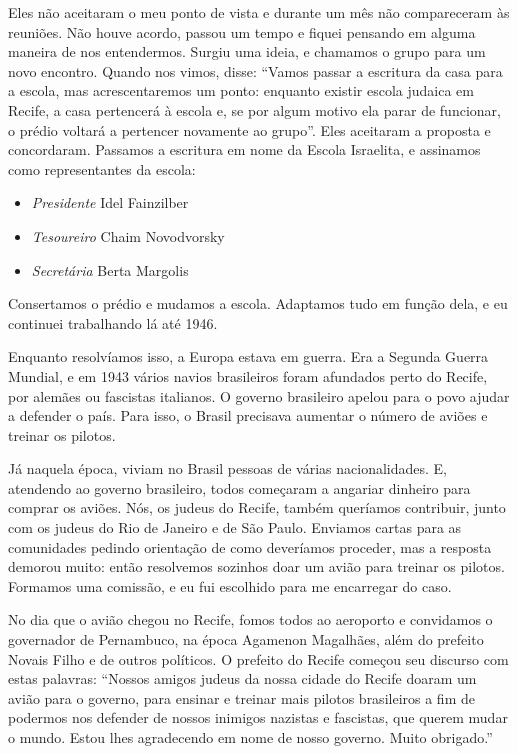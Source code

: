 Eles não aceitaram o meu ponto de vista e durante um mês não
compareceram às reuniões. Não houve acordo, passou
um tempo e fiquei pensando em alguma maneira de nos entendermos.
Surgiu uma ideia, e chamamos o grupo para um novo encontro. Quando nos
vimos, disse: ``Vamos passar a escritura da casa
para a escola, mas acrescentaremos um ponto: enquanto existir escola
judaica em Recife, a casa pertencerá à escola e, se por algum motivo
ela parar de funcionar, o prédio voltará a pertencer novamente ao
grupo''. Eles aceitaram a proposta e concordaram. Passamos a escritura
em nome da Escola Israelita, e assinamos como representantes da escola:

\begin{itemize}
\item \textit{Presidente} Idel Fainzilber
\item \textit{Tesoureiro} Chaim Novodvorsky
\item \textit{Secretária} Berta Margolis
\end{itemize}

Consertamos o prédio e mudamos a escola. Adaptamos tudo em função dela,
e eu continuei trabalhando lá até 1946.

Enquanto resolvíamos isso, a Europa estava em guerra. Era a Segunda Guerra Mundial, 
e em 1943 vários navios brasileiros foram
afundados perto do Recife, por alemães ou fascistas italianos. O governo
brasileiro apelou para o povo ajudar a defender o país. Para isso,
o Brasil precisava aumentar o número de aviões e treinar os pilotos.

Já naquela época, viviam no Brasil pessoas de várias nacionalidades. E,
atendendo ao governo brasileiro, todos começaram a angariar dinheiro para
comprar os aviões. Nós, os judeus do Recife, também queríamos
contribuir, junto com os judeus do Rio de Janeiro e de São Paulo.
Enviamos cartas para as comunidades pedindo orientação de como
deveríamos proceder, mas a resposta demorou muito: então resolvemos
sozinhos doar um avião para treinar os pilotos. Formamos uma comissão, e
eu fui escolhido para me encarregar do caso.

No dia que o avião chegou no Recife, fomos todos ao aeroporto e
convidamos o governador de Pernambuco, na época Agamenon Magalhães, além do
prefeito Novais Filho e de outros políticos. O prefeito do
Recife começou seu discurso com estas palavras: ``Nossos amigos judeus
da nossa cidade do Recife doaram um avião para o governo, para
ensinar e treinar mais pilotos brasileiros a fim de podermos nos defender
de nossos inimigos nazistas e fascistas, que querem mudar o
mundo. Estou lhes agradecendo em nome de nosso governo. Muito obrigado.''

